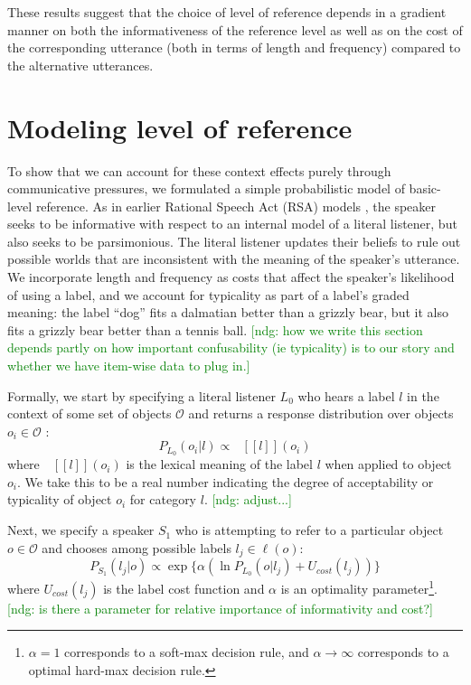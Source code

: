 \documentclass[10pt,letterpaper]{article}
\newcommand{\ndg}[1]{\textcolor{Green}{[ndg: #1]}}
\newcommand{\denote}[1]{\mbox{ $[\![ #1 ]\!]$}}
\begin{document}
These results suggest that the choice of level of reference depends in a gradient manner on both the informativeness of the reference level as well as on the cost of the corresponding utterance (both in terms of length and frequency) compared to the alternative utterances.




\section{\bf Modeling level of reference}

To show that we can account for these context effects purely through communicative pressures, we formulated a simple probabilistic model of basic-level reference. As in earlier Rational Speech Act (RSA) models \cite{frank2012, goodmanstuhlmueller2013}, the speaker seeks to be informative with respect to an internal model of a literal listener, but also seeks to be parsimonious. The literal listener updates their beliefs to rule out possible worlds that are inconsistent with the meaning of the speaker's utterance. We incorporate length and frequency as costs that affect the speaker's likelihood of using a label, and we account for typicality as part of a label's graded meaning: the label ``dog'' fits a dalmatian better than a grizzly bear, but it also fits a grizzly bear better than a tennis ball.
\ndg{how we write this section depends partly on how important confusability (ie typicality) is to our story and whether we have item-wise data to plug in.}

Formally, we start by specifying a literal listener $L_0$ who hears a label $l$ in the context of some set of objects $\mathcal{O}$ and returns a response distribution over objects $o_i \in \mathcal{O}$ : 
$$P_{L_0}(o_i | l) \propto \denote{l}(o_i)$$
where $\denote{l}(o_i)$ is the lexical meaning of the label $l$ when applied to object $o_i$. We take this to be a real number indicating the degree of acceptability or typicality of object $o_i$ for category $l$. \ndg{adjust...}

Next, we specify a speaker $S_1$ who is attempting to refer to a particular object $o \in \mathcal{O}$ and chooses among possible labels $l_j \in \ell(o)$: 
$$P_{S_1}(l_j | o) \propto \exp\{\alpha \left( \ln P_{L_0}(o | l_j) + U_{cost}(l_j) \right) \}$$
where $U_{cost}(l_j)$ is the label cost function and $\alpha$ is an optimality parameter\footnote{$\alpha = 1$ corresponds to a soft-max decision rule, and $\alpha \rightarrow \infty$ corresponds to a optimal hard-max decision rule.}. \ndg{is there a parameter for relative importance of informativity and cost?}
\end{document}

